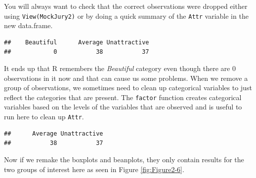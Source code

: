 \documentclass[]{book}
\newenvironment{Shaded}{\begin{snugshade}}{\end{snugshade}}
\newcommand{\KeywordTok}[1]{\textcolor[rgb]{0.13,0.29,0.53}{\textbf{#1}}}
\newcommand{\StringTok}[1]{\textcolor[rgb]{0.31,0.60,0.02}{#1}}
\newcommand{\OperatorTok}[1]{\textcolor[rgb]{0.81,0.36,0.00}{\textbf{#1}}}
\newcommand{\NormalTok}[1]{#1}
\theoremstyle{definition}
\theoremstyle{definition}
\theoremstyle{remark}
\begin{document}
You will always want to check that the correct observations were dropped
either using \texttt{View(MockJury2)} or by doing a quick summary of the
\texttt{Attr} variable in the new data.frame.

\begin{Shaded}
\end{Shaded}

\begin{verbatim}
##    Beautiful      Average Unattractive 
##            0           38           37
\end{verbatim}

It ends up that R remembers the \emph{Beautiful} category even though
there are 0 observations in it now and that can cause us some problems.
When we remove a group of observations, we sometimes need to clean up
categorical variables to just reflect the categories that are present.
The \texttt{factor} function creates categorical variables based on the
levels of the variables that are observed and is useful to run here to
clean up \texttt{Attr}.

\begin{Shaded}
\end{Shaded}

\begin{verbatim}
##      Average Unattractive 
##           38           37
\end{verbatim}

Now if we remake the boxplots and beanplots, they only contain results
for the two groups of interest here as seen in Figure
\ref{fig:Figure2-6}.
\end{document}
